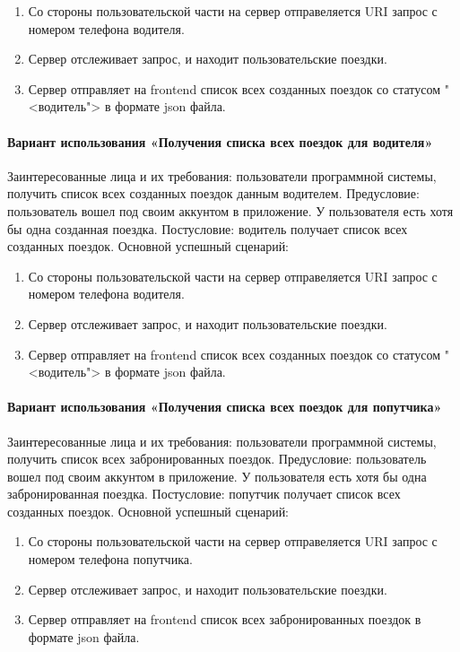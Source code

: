 \begin{enumerate}
	\item Со стороны пользовательской части на сервер отправеляется URI запрос с номером телефона водителя.
	\item Сервер отслеживает запрос, и находит пользовательские поездки.
	\item Сервер отправляет на frontend список всех созданных поездок со статусом "<водитель"> в формате json файла.
\end{enumerate}

\paragraph{Вариант использования «Получения списка всех поездок для водителя»}
Заинтересованные лица и их требования: пользователи программной системы, получить список всех созданных поездок данным водителем. Предусловие:  пользователь вошел под своим аккунтом в приложение. У пользователя есть хотя бы одна созданная поездка. Постусловие: водитель получает список всех созданных поездок.
Основной успешный сценарий:

\begin{enumerate}
	\item Со стороны пользовательской части на сервер отправеляется URI запрос с номером телефона водителя.
	\item Сервер отслеживает запрос, и находит пользовательские поездки.
	\item Сервер отправляет на frontend список всех созданных поездок со статусом "<водитель"> в формате json файла.
\end{enumerate}

\paragraph{Вариант использования «Получения списка всех поездок для попутчика»}
Заинтересованные лица и их требования: пользователи программной системы, получить список всех забронированных поездок. Предусловие:  пользователь вошел под своим аккунтом в приложение. У пользователя есть хотя бы одна забронированная поездка. Постусловие: попутчик получает список всех созданных поездок.
Основной успешный сценарий:

\begin{enumerate}
	\item Со стороны пользовательской части на сервер отправеляется URI запрос с номером телефона попутчика.
	\item Сервер отслеживает запрос, и находит пользовательские поездки.
	\item Сервер отправляет на frontend список всех забронированных поездок в формате json файла.
\end{enumerate}

